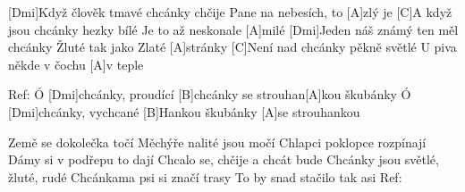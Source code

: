 
[Dmi]Když člověk tmavé chcánky chčije
Pane na nebesích, to [A]zlý je
[C]A když jsou chcánky hezky bílé
Je to až neskonale [A]milé
[Dmi]Jeden náš známý ten měl chcánky
Žluté tak jako Zlaté [A]stránky
[C]Není nad chcánky pěkně světlé
U piva někde v čochu [A]v teple


Ref:
Ó [Dmi]chcánky, proudící [B]chcánky
se strouhan[A]kou škubánky
Ó [Dmi]chcánky, vychcané [B]Hankou
škubánky [A]se strouhankou


Země se dokolečka točí
Měchýře nalité jsou močí
Chlapci poklopce rozpínají
Dámy si v podřepu to dají
Chcalo se, chčije a chcát bude
Chcánky jsou světlé, žluté, rudé
Chcánkama psi si značí trasy
To by snad stačilo tak asi
Ref:
